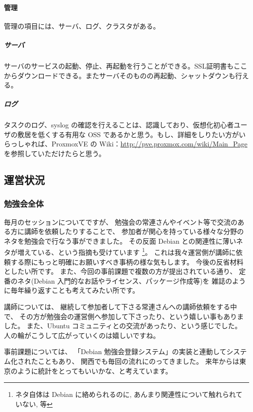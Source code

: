 \documentclass[mingoth,a4paper]{jsarticle}
\begin{document}
\paragraph{管理}
管理の項目には、サーバ、ログ、クラスタがある。

\subparagraph{サーバ}
サーバのサービスの起動、停止、再起動を行うことができる。SSL証明書もここからダウンロードできる。またサーバそのものの再起動、シャットダウンも行える。

\subparagraph{ログ}
タスクのログ、syslog の確認を行えることは、認識しており、仮想化初心者ユー
ザの敷居を低くする有用な OSS であるかと思う。もし、詳細をしりたい方がい
らっしゃれば、ProxmoxVE の Wiki：\url{http://pve.proxmox.com/wiki/Main_Page}を参照していただけたらと思う。


\subsection{運営状況}

\subsubsection{勉強会全体}

毎月のセッションについてですが、 %
勉強会の常連さんやイベント等で交流のある方に講師を依頼したりすることで、 %
参加者が関心を持っている様々な分野のネタを勉強会で行なう事ができました。
その反面 Debian との関連性に薄いネタが増えている、という指摘も受けています
\footnote{ネタ自体は Debian に絡められるのに, あんまり関連性について触れられていない, 等}。%
これは我々運営側が講師に依頼する際にもっと明確にお願いすべき事柄の様な気もします。%
今後の反省材料としたい所です。
また、今回の事前課題で複数の方が提出されている通り、%
定番のネタ(Debian 入門的なお話やライセンス、パッケージ作成等)を%
雑誌のように毎年繰り返すことも考えてみたい所です。

講師については、%
継続して参加者して下さる常連さんへの講師依頼をする中で、%
その方が勉強会の運営側へ参加して下さったり、という嬉しい事もありました。
また、Ubuntu コミュニティとの交流があったり、という感じでした。
人の輪がこうして広がっていくのは嬉しいですね。

事前課題については、%
「Debian 勉強会登録システム」の実装と連動してシステム化されたこともあり、%
関西でも毎回の流れにのってきました。%
来年からは東京のように統計をとってもいいかな、と考えています。
\end{document}
